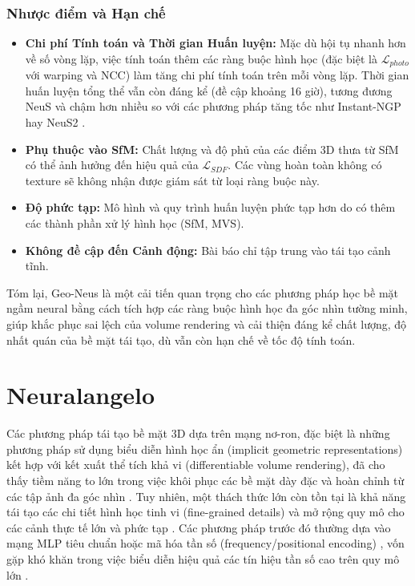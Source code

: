 \subsubsection{Nhược điểm và Hạn chế}
\begin{itemize}
    \item \textbf{Chi phí Tính toán và Thời gian Huấn luyện:} Mặc dù hội tụ nhanh hơn về số vòng lặp, việc tính toán thêm các ràng buộc hình học (đặc biệt là $\mathcal{L}_{photo}$ với warping và NCC) làm tăng chi phí tính toán trên mỗi vòng lặp. Thời gian huấn luyện tổng thể vẫn còn đáng kể (đề cập khoảng 16 giờ), tương đương NeuS và chậm hơn nhiều so với các phương pháp tăng tốc như Instant-NGP hay NeuS2 \cite{Fu2022GeoNeus_source_149, Fu2022GeoNeus_source_188}.
    \item \textbf{Phụ thuộc vào SfM:} Chất lượng và độ phủ của các điểm 3D thưa từ SfM có thể ảnh hưởng đến hiệu quả của $\mathcal{L}_{SDF}$. Các vùng hoàn toàn không có texture sẽ không nhận được giám sát từ loại ràng buộc này.
    \item \textbf{Độ phức tạp:} Mô hình và quy trình huấn luyện phức tạp hơn do có thêm các thành phần xử lý hình học (SfM, MVS).
    \item \textbf{Không đề cập đến Cảnh động:} Bài báo chỉ tập trung vào tái tạo cảnh tĩnh.
\end{itemize}

Tóm lại, Geo-Neus là một cải tiến quan trọng cho các phương pháp học bề mặt ngầm neural bằng cách tích hợp các ràng buộc hình học đa góc nhìn tường minh, giúp khắc phục sai lệch của volume rendering và cải thiện đáng kể chất lượng, độ nhất quán của bề mặt tái tạo, dù vẫn còn hạn chế về tốc độ tính toán.

\section{Neuralangelo}
Các phương pháp tái tạo bề mặt 3D dựa trên mạng nơ-ron, đặc biệt là những phương pháp sử dụng biểu diễn hình học ẩn (implicit geometric representations) kết hợp với kết xuất thể tích khả vi (differentiable volume rendering), đã cho thấy tiềm năng to lớn trong việc khôi phục các bề mặt dày đặc và hoàn chỉnh từ các tập ảnh đa góc nhìn \cite{Wang21NeuS, Yariv21VolSDF, Yariv20IDR}. Tuy nhiên, một thách thức lớn còn tồn tại là khả năng tái tạo các chi tiết hình học tinh vi (fine-grained details) và mở rộng quy mô cho các cảnh thực tế lớn và phức tạp \cite{Li23Neuralangelo}. Các phương pháp trước đó thường dựa vào mạng MLP tiêu chuẩn hoặc mã hóa tần số (frequency/positional encoding) \cite{Mildenhall2020NeRF, Tancik20Fourier}, vốn gặp khó khăn trong việc biểu diễn hiệu quả các tín hiệu tần số cao trên quy mô lớn \cite{Muller22InstantNGP}.

